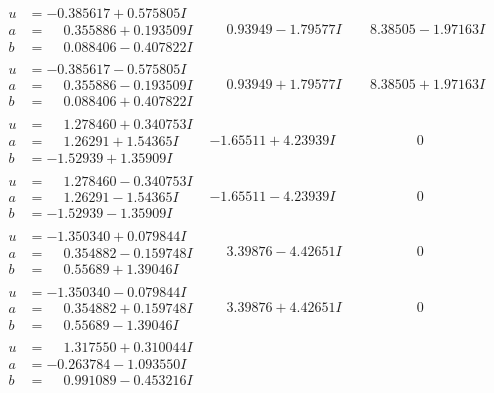\documentclass[1p]{elsarticle_modified}
\theoremstyle{definition}
\begin{document}
$$\begin{array}{c|c|c}
\begin{aligned}
u &= -0.385617 + 0.575805 I \\
a &= \phantom{-}0.355886 + 0.193509 I \\
b &= \phantom{-}0.088406 - 0.407822 I\end{aligned}
 & \phantom{-}0.93949 - 1.79577 I & \phantom{-}8.38505 - 1.97163 I \\ \hline\begin{aligned}
u &= -0.385617 - 0.575805 I \\
a &= \phantom{-}0.355886 - 0.193509 I \\
b &= \phantom{-}0.088406 + 0.407822 I\end{aligned}
 & \phantom{-}0.93949 + 1.79577 I & \phantom{-}8.38505 + 1.97163 I \\ \hline\begin{aligned}
u &= \phantom{-}1.278460 + 0.340753 I \\
a &= \phantom{-}1.26291 + 1.54365 I \\
b &= -1.52939 + 1.35909 I\end{aligned}
 & -1.65511 + 4.23939 I & \phantom{-0.000000 } 0 \\ \hline\begin{aligned}
u &= \phantom{-}1.278460 - 0.340753 I \\
a &= \phantom{-}1.26291 - 1.54365 I \\
b &= -1.52939 - 1.35909 I\end{aligned}
 & -1.65511 - 4.23939 I & \phantom{-0.000000 } 0 \\ \hline\begin{aligned}
u &= -1.350340 + 0.079844 I \\
a &= \phantom{-}0.354882 - 0.159748 I \\
b &= \phantom{-}0.55689 + 1.39046 I\end{aligned}
 & \phantom{-}3.39876 - 4.42651 I & \phantom{-0.000000 } 0 \\ \hline\begin{aligned}
u &= -1.350340 - 0.079844 I \\
a &= \phantom{-}0.354882 + 0.159748 I \\
b &= \phantom{-}0.55689 - 1.39046 I\end{aligned}
 & \phantom{-}3.39876 + 4.42651 I & \phantom{-0.000000 } 0 \\ \hline\begin{aligned}
u &= \phantom{-}1.317550 + 0.310044 I \\
a &= -0.263784 - 1.093550 I \\
b &= \phantom{-}0.991089 - 0.453216 I\end{aligned}

\end{array}$$
\end{document}
